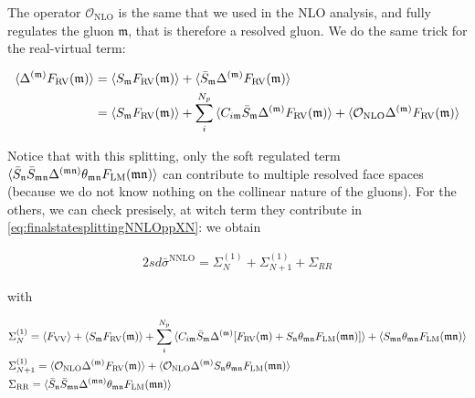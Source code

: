 \documentclass[11pt]{report}
\begin{document}
The operator \(\mathcal{O}_{\text{NLO}}\) is the same that we used in the NLO analysis, and fully regulates the gluon \(\mathfrak{m}\), that is therefore a resolved gluon. We do the same trick for the real-virtual term: 

\begin{align}
    \braket{\Delta^{(\mathfrak{m})}F_{\text{RV}}(\mathfrak{m})} &= \braket{S_{\mathfrak{m}}F_{\text{RV}}(\mathfrak{m})} + \braket{\bar{S}_{\mathfrak{m}}\Delta^{(\mathfrak{m})}F_{\text{RV}}(\mathfrak{m})} \notag \\ 
    &= \braket{S_{\mathfrak{m}}F_{\text{RV}}(\mathfrak{m})} + \sum_{i}^{N_p}\braket{C_{i\mathfrak{m}}\bar{S}_{\mathfrak{m}}\Delta^{(\mathfrak{m})}F_{\text{RV}}(\mathfrak{m})} + \braket{\mathcal{O}_{\text{NLO}}\Delta^{(\mathfrak{m})}F_{\text{RV}}(\mathfrak{m})} 
\end{align}

Notice that with this splitting, only the soft regulated term \(\braket{\bar{S}_{\mathfrak{n}}\bar{S}_{\mathfrak{mn}}\Delta^{(\mathfrak{mn})}\theta_{\mathfrak{mn}}F_{\text{LM}}(\mathfrak{mn})}\) can contribute to multiple resolved face spaces (because we do not know nothing on the collinear nature of the gluons). For the others, we can check presisely, at witch term they contribute in \ref{eq:finalstatesplittingNNLOppXN}: we obtain 

\begin{align}
    2sd\bar{\sigma}^{\text{NNLO}} = \Sigma^{(1)}_N + \Sigma^{(1)}_{N+1} + \Sigma_{RR}
\end{align}

with 

\begin{align}
    &\Sigma^{(1)}_N = \braket{F_{\text{VV}}} + \braket{S_{\mathfrak{m}}F_{\text{RV}}(\mathfrak{m})} + \sum_{i}^{N_p}\braket{C_{i\mathfrak{m}}\bar{S}_{\mathfrak{m}}\Delta^{(\mathfrak{m})}[F_{\text{RV}}(\mathfrak{m}) + S_{\mathfrak{n}}\theta_{\mathfrak{mn}}F_{\text{LM}}(\mathfrak{mn})]} + \braket{S_{\mathfrak{mn}}\theta_{\mathfrak{mn}}F_{\text{LM}}(\mathfrak{mn})} \notag \\ 
    &\Sigma^{(1)}_{N+1} = \braket{\mathcal{O}_{\text{NLO}}\Delta^{(\mathfrak{m})}F_{\text{RV}}(\mathfrak{m})} + \braket{\mathcal{O}_{\text{NLO}}\Delta^{(\mathfrak{m})}S_{\mathfrak{n}}\theta_{\mathfrak{mn}}F_{\text{LM}}(\mathfrak{mn})} \notag \\ 
    &\Sigma_{\text{RR}} = \braket{\bar{S}_{\mathfrak{n}}\bar{S}_{\mathfrak{mn}}\Delta^{(\mathfrak{mn})}\theta_{\mathfrak{mn}}F_{\text{LM}}(\mathfrak{mn})}
\end{align}
\end{document}
